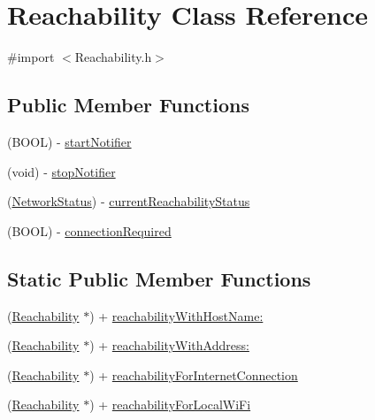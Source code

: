 \hypertarget{interface_reachability}{
\section{\-Reachability \-Class \-Reference}
\label{interface_reachability}
}


{\ttfamily \#import $<$\-Reachability.\-h$>$}

\subsection*{\-Public \-Member \-Functions}
\begin{DoxyCompactItemize}
\item 
(\-B\-O\-O\-L) -\/ \hyperlink{interface_reachability_ae20732960a222681fcc7caeb191158bc}{start\-Notifier}
\item 
(void) -\/ \hyperlink{interface_reachability_ab7907e9c8de0e4e15774e82c089e0b39}{stop\-Notifier}
\item 
(\hyperlink{_reachability_8h_afbfc456845719ac215946bb2b05eb2df}{\-Network\-Status}) -\/ \hyperlink{interface_reachability_a8396438436e7ff3770039fb527cd1d34}{current\-Reachability\-Status}
\item 
(\-B\-O\-O\-L) -\/ \hyperlink{interface_reachability_a731496d70dd8bfbd1b364df13cac2b4c}{connection\-Required}
\end{DoxyCompactItemize}
\subsection*{\-Static \-Public \-Member \-Functions}
\begin{DoxyCompactItemize}
\item 
(\hyperlink{interface_reachability}{\-Reachability} $\ast$) + \hyperlink{interface_reachability_a0c293c3ffea29c42e8ccbd5d2b39a769}{reachability\-With\-Host\-Name\-:}
\item 
(\hyperlink{interface_reachability}{\-Reachability} $\ast$) + \hyperlink{interface_reachability_add9b3533dfed13fc2215cc27bca74ace}{reachability\-With\-Address\-:}
\item 
(\hyperlink{interface_reachability}{\-Reachability} $\ast$) + \hyperlink{interface_reachability_ad2962f5292dee6a56f43175d344c3da1}{reachability\-For\-Internet\-Connection}
\item 
(\hyperlink{interface_reachability}{\-Reachability} $\ast$) + \hyperlink{interface_reachability_afef931b75654390d24d9c897835929f5}{reachability\-For\-Local\-Wi\-Fi}
\end{DoxyCompactItemize}
